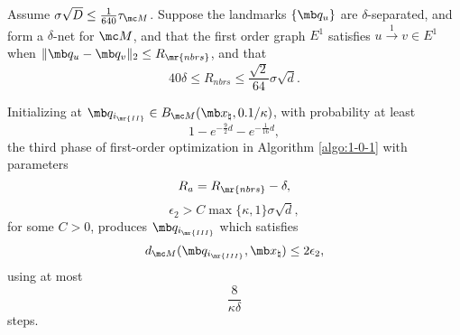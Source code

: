 \begin{proposition}\label{prop:phase III}
      Assume $\sigma\sqrt{D} \leq \frac{1}{640} \tau_{\mc M}$. Suppose the landmarks $\{ \mb q_u \}$ are $\delta$-separated, and form a $\delta$-net for $\mc M$, and that the first order graph $E^1$ satisfies $u \overset{1}{\rightarrow} v \in E^1$ when $\| \mb q_u - \mb q_v \|_2 \le R_{\mr{nbrs}}$, and that 
      \begin{equation}\label{eqn:PIII_RNBR_COND}
          40 \delta \le R_{nbrs} \le \frac{\sqrt{2}}{64}\sigma \sqrt{d}.
      \end{equation}
       
      Initializing at $\mb q_{i_{\mr{II}}} \in B_{\mc M}(\mb x_\natural, 0.1/\kappa)$,
       with probability at least 
      \begin{equation}
          1 - e^{-\tfrac{9}{2} d} - e^{-\frac{1}{16}d}, 
      \end{equation} 
      the third phase of first-order optimization in Algorithm \ref{algo:1-0-1} with parameters
      \begin{equation}
          R_a = R_{\mr{nbrs}} - \delta,
      \end{equation}
      \begin{equation}
          \epsilon_2 > { C\max\{\kappa,1\} } \sigma \sqrt{d},
      \end{equation}      
      for some $C > 0$, produces $\mb q_{i_{\mr{III}}}$ which satisfies
    \begin{equation}
        d_{\mc M}(\mb q_{i_{\mr{III}}}, \mb x_\natural) \leq {2\epsilon_2},
    \end{equation}
using at most
\begin{equation}
    \frac{8}{\kappa\delta}
\end{equation}
steps.
\end{proposition}




